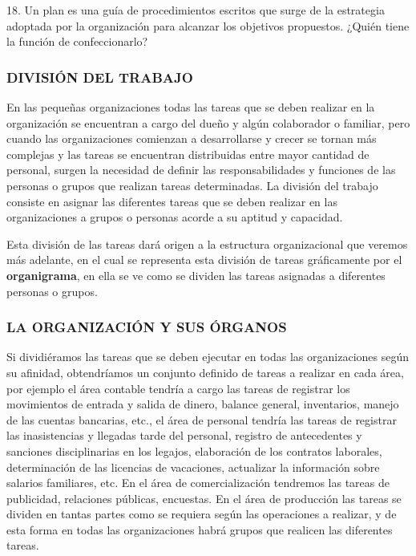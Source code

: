 18. Un plan es una guía de procedimientos escritos que surge de la estrategia adoptada por la organización para alcanzar los objetivos propuestos. ¿Quién tiene la función de confeccionarlo?



\subsubsection*{DIVISIÓN DEL TRABAJO}
En las pequeñas organizaciones todas las tareas que se deben realizar en la organización se encuentran a cargo del dueño y algún colaborador o familiar, pero cuando las organizaciones comienzan a desarrollarse y crecer se tornan más complejas y las tareas se encuentran distribuidas entre mayor cantidad de personal, surgen la necesidad de definir las responsabilidades y funciones de las personas o grupos que realizan tareas determinadas. La división del trabajo consiste en asignar las diferentes tareas que se deben realizar en las organizaciones a grupos o personas acorde a su aptitud y capacidad.

Esta división de las tareas dará origen a la estructura organizacional que veremos más adelante, en el cual se representa esta división de tareas gráficamente por el \textbf{organigrama}, en ella se ve como se dividen las tareas asignadas a diferentes personas o grupos.

\subsubsection*{LA ORGANIZACIÓN Y SUS ÓRGANOS}
Si dividiéramos las tareas que se deben ejecutar en todas las organizaciones según su afinidad, obtendríamos un conjunto definido de tareas a realizar en cada área, por ejemplo el área contable tendría a cargo las tareas de registrar los movimientos de entrada y salida de dinero, balance general, inventarios, manejo de las cuentas bancarias, etc., el área de personal tendría las tareas de registrar las inasistencias y llegadas tarde del personal, registro de antecedentes y sanciones disciplinarias en los legajos, elaboración de los contratos laborales, determinación de las licencias de vacaciones, actualizar la información sobre salarios familiares, etc. En el área de comercialización tendremos las tareas de publicidad, relaciones públicas, encuestas. En el área de producción las tareas se dividen en tantas partes como se requiera según las operaciones a realizar, y de esta forma en todas las organizaciones habrá grupos que realicen las diferentes tareas.

